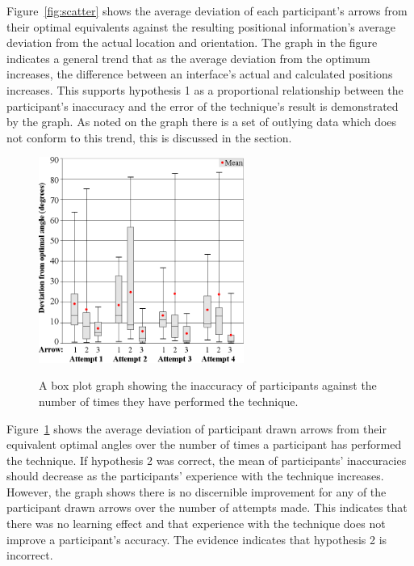 \documentclass{bmcart}
\begin{document}
Figure~\ref{fig:scatter} shows the average deviation of each participant's arrows from their optimal equivalents against the resulting positional information's average deviation from the actual location and orientation.
The graph in the figure indicates a general trend that as the average deviation from the optimum increases, the difference between an interface's actual and calculated positions increases.
This supports hypothesis 1 as a proportional relationship between the participant's inaccuracy and the error of the technique's result is demonstrated by the graph.
As noted on the graph there is a set of outlying data which does not conform to this trend, this is discussed in the  section.

\begin{figure}[h]
   \centering
   \caption{A box plot graph showing the inaccuracy of participants against the number of times they have performed the technique.}
   \includegraphics[width=0.6\textwidth]{figures/angle_deviation_boxplots.png}
   \label{fig:boxPlot}
\end{figure}

Figure~\ref{fig:boxPlot} shows the average deviation of participant drawn arrows from their equivalent optimal angles over the number of times a participant has performed the technique.
If hypothesis 2 was correct, the mean of participants' inaccuracies should decrease as the participants' experience with the technique increases.
However,  the graph shows there is no discernible improvement for any of the participant drawn arrows over the number of attempts made.
This indicates that there was no learning effect and that experience with the technique does not improve a participant's accuracy.
The evidence indicates that hypothesis 2 is incorrect.
\end{document}
